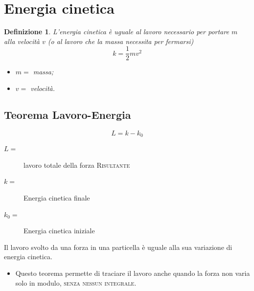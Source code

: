 \documentclass{book}
\newtheorem{defi}{Definizione}[section]
\begin{document}
\section{Energia cinetica}
\label{sec:energiacin}

\begin{defi}
  L'energia cinetica è uguale al lavoro necessario per portare $m$ alla velocità $v$ (o al lavoro che la massa necessita per fermarsi)
  \begin{equation}
    \label{eq:energiacin}
    k=\frac{1}{2} mv^2
  \end{equation}
  \begin{itemize}
  \item $m=$ massa;
  \item $v=$ velocità.
  \end{itemize}
\end{defi}

\subsection{Teorema Lavoro-Energia}
\label{sec:teoLavEn}

\begin{equation}
  \label{eq:teoLavEn}
  L=k-k_0
\end{equation}
\begin{description}
\item[$L=$] lavoro totale della forza \textsc{Risultante}
\item[$k=$] Energia cinetica finale
\item[$k_0=$] Energia cinetica iniziale
\end{description}
Il lavoro svolto da una forza in una particella è uguale alla sua variazione di energia cinetica.
\begin{itemize}
\item Questo teorema permette di traciare il lavoro anche quando la forza non varia solo in modulo, \textsc{senza nessun integrale}. 
\end{itemize}
\end{document}
